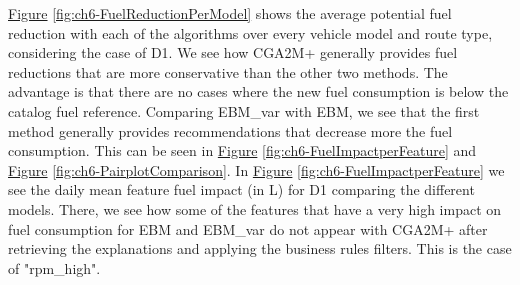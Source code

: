 \begin{table}[h!]
\centering
{}
\caption{Different MAPE metrics for each of the models versus the catalog fuel consumption (MAPE 1), the median inliers (MAPE 2), or considering only the vehicles with outlier fuel consumption versus the inliers (MAPE 3).}
\label{table:ch6-comparison-fuel-reference}
\end{table}

\hyperref[fig:ch6-FuelReductionPerModel]{Figure} \ref{fig:ch6-FuelReductionPerModel} shows the average potential fuel reduction with each of the algorithms over every vehicle model and route type, considering the case of D1. We see how CGA2M+ generally provides fuel reductions that are more conservative than the other two methods. The advantage is that there are no cases where the new fuel consumption is below the catalog fuel reference. Comparing EBM\_var with EBM, we see that the first method generally provides recommendations that decrease more the fuel consumption.
This can be seen in \hyperref[fig:ch6-FuelImpactperFeature]{Figure} \ref{fig:ch6-FuelImpactperFeature} and \hyperref[fig:ch6-PairplotComparison]{Figure} \ref{fig:ch6-PairplotComparison}. In \hyperref[fig:ch6-FuelImpactperFeature]{Figure} \ref{fig:ch6-FuelImpactperFeature} we see the daily mean feature fuel impact (in L) for D1 comparing the different models. There, we see how some of the features that have a very high impact on fuel consumption for EBM and EBM\_var do not appear with CGA2M+ after retrieving the explanations and applying the business rules filters. This is the case of "rpm\_high". 

